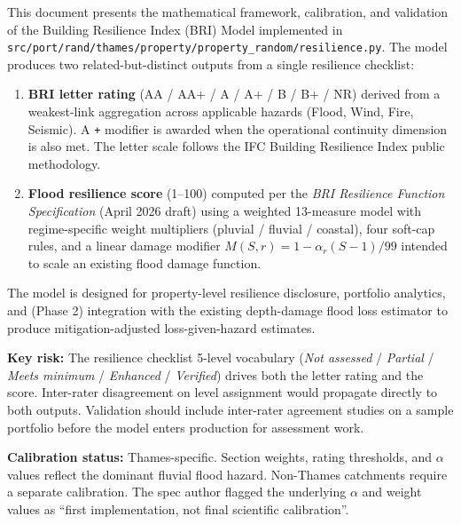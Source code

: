 \documentclass[11pt,a4paper]{article}
\begin{document}
\mkmtitlepage
\mkmlegalpage
\tableofcontents
\clearpage

\mkmexecsummary

This document presents the mathematical framework, calibration, and validation of the
Building Resilience Index (BRI) Model implemented in
\texttt{src/port/rand/thames/property/property\_random/resilience.py}. The model
produces two related-but-distinct outputs from a single resilience checklist:

\begin{enumerate}[nosep]
    \item \textbf{BRI letter rating} (AA / AA+ / A / A+ / B / B+ / NR) derived from a
          weakest-link aggregation across applicable hazards (Flood, Wind, Fire,
          Seismic). A \texttt{+} modifier is awarded when the operational continuity
          dimension is also met. The letter scale follows the IFC Building Resilience
          Index public methodology.
    \item \textbf{Flood resilience score} (1--100) computed per the
          \emph{BRI Resilience Function Specification} (April 2026 draft) using a
          weighted 13-measure model with regime-specific weight multipliers
          (pluvial / fluvial / coastal), four soft-cap rules, and a linear damage
          modifier $M(S, r) = 1 - \alpha_r (S-1)/99$ intended to scale an existing
          flood damage function.
\end{enumerate}

\noindent The model is designed for property-level resilience disclosure, portfolio
analytics, and (Phase 2) integration with the existing depth-damage flood loss
estimator to produce mitigation-adjusted loss-given-hazard estimates.

\textbf{Key risk:} The resilience checklist 5-level vocabulary (\emph{Not assessed} /
\emph{Partial} / \emph{Meets minimum} / \emph{Enhanced} / \emph{Verified}) drives both
the letter rating and the score. Inter-rater disagreement on level assignment would
propagate directly to both outputs. Validation should include inter-rater agreement
studies on a sample portfolio before the model enters production for assessment work.

\textbf{Calibration status:} Thames-specific. Section weights, rating thresholds, and
$\alpha$ values reflect the dominant fluvial flood hazard. Non-Thames catchments
require a separate calibration. The spec author flagged the underlying $\alpha$ and
weight values as ``first implementation, not final scientific calibration''.
\end{document}

